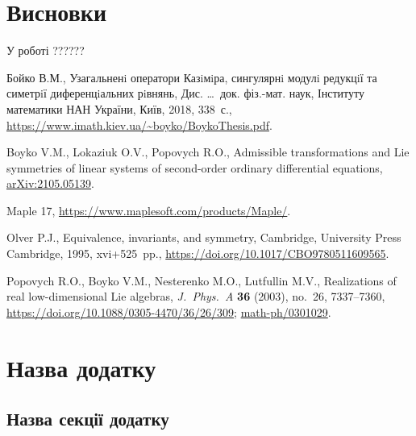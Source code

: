 \documentclass{thesis}
\begin{document}
\chapter*{Висновки}

У роботі ??????

\newpage

\renewcommand{\bibname}{Список використаних джерел}

\begin{thebibliography}{99}
\itemsep=0pt

Бойко В.М.,
Узагальненi оператори Казiмiра,
сингулярнi модулi редукцiї
та симетрiї диференцiальних рiвнянь,
Дис. \dots\ док. фіз.-мат. наук,  Інституту математики НАН України, Київ, 2018, 338~с., \url{https://www.imath.kiev.ua/~boyko/BoykoThesis.pdf}.



Boyko V.M., Lokaziuk O.V., Popovych R.O.,
Admissible transformations and Lie symmetries of linear systems of second-order ordinary differential equations, \href{https://arxiv.org/abs/2105.05139}{arXiv:2105.05139}.

Maple 17, \url{https://www.maplesoft.com/products/Maple/}.


Olver P.J., Equivalence, invariants, and symmetry, Cambridge, University Press Cambridge, 1995, xvi+525~pp.,
\url{https://doi.org/10.1017/CBO9780511609565}.


Popovych R.O., Boyko V.M., Nesterenko M.O., Lutfullin M.V., Realizations of real low-dimensional Lie algebras, \textit{J.~Phys.~A} \textbf{36} (2003), no.~26,
7337--7360, \url{https://doi.org/10.1088/0305-4470/36/26/309}; \href{https://arxiv.org/abs/math-ph/0301029}{math-ph/0301029}.



\end{thebibliography}

\appendix

\chapter{Назва додатку}\label{appendix1}

\section{Назва секції додатку}\label{appendix1.1}
\end{document}
